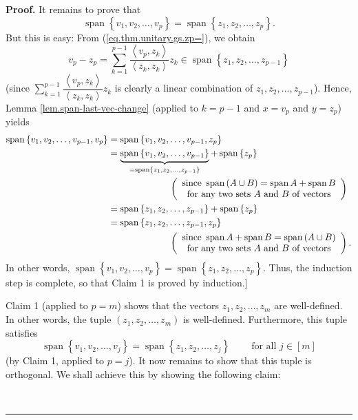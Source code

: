 \documentclass[numbers=enddot,12pt,final,onecolumn,notitlepage]{scrartcl}%
\numberwithin{exer}{subsection}
\theoremstyle{definition}
\newenvironment{proof}[1][Proof]{\noindent\textbf{#1.} }{\ \rule{0.5em}{0.5em}}
\let\sumnonlimits\sum
\renewcommand{\sum}{\sumnonlimits\limits}
\begin{document}
\begin{proof}
It remains to prove that
\[
\operatorname*{span}\left\{  v_{1},v_{2},\ldots,v_{p}\right\}
=\operatorname*{span}\left\{  z_{1},z_{2},\ldots,z_{p}\right\}  .
\]
But this is easy: From (\ref{eq.thm.unitary.gs.zp=}), we obtain%
\[
v_{p}-z_{p}=\sum_{k=1}^{p-1}\dfrac{\left\langle v_{p},z_{k}\right\rangle
}{\left\langle z_{k},z_{k}\right\rangle }z_{k}\in\operatorname*{span}\left\{
z_{1},z_{2},\ldots,z_{p-1}\right\}
\]
(since $\sum_{k=1}^{p-1}\dfrac{\left\langle v_{p},z_{k}\right\rangle
}{\left\langle z_{k},z_{k}\right\rangle }z_{k}$ is clearly a linear
combination of $z_{1},z_{2},\ldots,z_{p-1}$). Hence, Lemma
\ref{lem.span-last-vec-change} (applied to $k=p-1$ and $x=v_{p}$ and $y=z_{p}%
$) yields%
\begin{align*}
\operatorname*{span}\left\{  v_{1},v_{2},\ldots,v_{p-1},v_{p}\right\}   &
=\operatorname*{span}\left\{  v_{1},v_{2},\ldots,v_{p-1},z_{p}\right\} \\
&  =\underbrace{\operatorname*{span}\left\{  v_{1},v_{2},\ldots,v_{p-1}%
\right\}  }_{=\operatorname*{span}\left\{  z_{1},z_{2},\ldots,z_{p-1}\right\}
}+\operatorname*{span}\left\{  z_{p}\right\} \\
&  \ \ \ \ \ \ \ \ \ \ \ \ \ \ \ \ \ \ \ \ \left(
\begin{array}
[c]{c}%
\text{since }\operatorname*{span}\left(  A\cup B\right)  =\operatorname*{span}%
A+\operatorname*{span}B\\
\text{for any two sets }A\text{ and }B\text{ of vectors}%
\end{array}
\right) \\
&  =\operatorname*{span}\left\{  z_{1},z_{2},\ldots,z_{p-1}\right\}
+\operatorname*{span}\left\{  z_{p}\right\} \\
&  =\operatorname*{span}\left\{  z_{1},z_{2},\ldots,z_{p-1},z_{p}\right\} \\
&  \ \ \ \ \ \ \ \ \ \ \ \ \ \ \ \ \ \ \ \ \left(
\begin{array}
[c]{c}%
\text{since }\operatorname*{span}A+\operatorname*{span}B=\operatorname*{span}%
\left(  A\cup B\right) \\
\text{for any two sets }A\text{ and }B\text{ of vectors}%
\end{array}
\right)  .
\end{align*}
In other words, $\operatorname*{span}\left\{  v_{1},v_{2},\ldots
,v_{p}\right\}  =\operatorname*{span}\left\{  z_{1},z_{2},\ldots
,z_{p}\right\}  $. Thus, the induction step is complete, so that Claim 1 is
proved by induction.]

Claim 1 (applied to $p=m$) shows that the vectors $z_{1},z_{2},\ldots,z_{m}$
are well-defined. In other words, the tuple $\left(  z_{1},z_{2},\ldots
,z_{m}\right)  $ is well-defined. Furthermore, this tuple satisfies%
\[
\operatorname*{span}\left\{  v_{1},v_{2},\ldots,v_{j}\right\}
=\operatorname*{span}\left\{  z_{1},z_{2},\ldots,z_{j}\right\}
\ \ \ \ \ \ \ \ \ \ \text{for all }j\in\left[  m\right]
\]
(by Claim 1, applied to $p=j$). It now remains to show that this tuple is
orthogonal. We shall achieve this by showing the following claim:


\end{proof}
\end{document}
